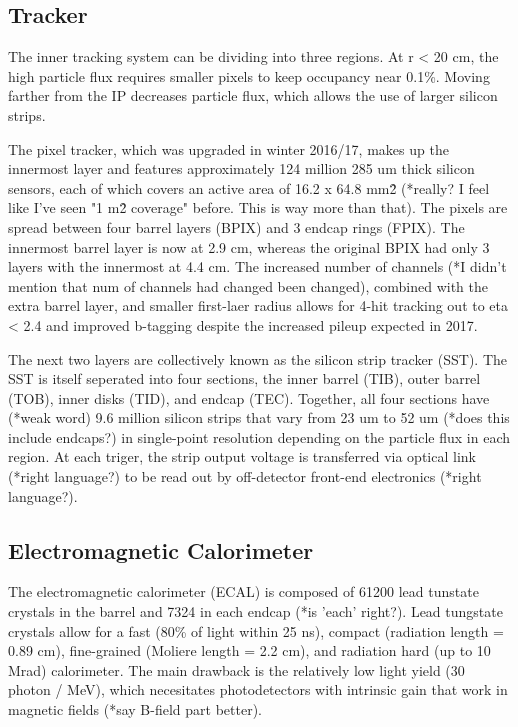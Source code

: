 \documentclass[12pt]{article}
\begin{document}
\subsection{Tracker}
        The inner tracking system can be dividing into three regions. At r < 20 cm, the high particle flux requires smaller pixels to keep occupancy near 0.1\%. Moving farther from the IP decreases particle flux, which allows the use of larger silicon strips.

        The pixel tracker, which was upgraded in winter 2016/17, makes up the innermost layer and features approximately 124 million 285 um thick silicon sensors, each of which covers an active area of 16.2 x 64.8 mm\^2 (*really? I feel like I've seen "1 m\^2 coverage" before. This is way more than that). The pixels are spread between four barrel layers (BPIX) and 3 endcap rings (FPIX). The innermost barrel layer is now at 2.9 cm, whereas the original BPIX had only 3 layers with the innermost at 4.4 cm. The increased number of channels (*I didn't mention that num of channels had changed been changed), combined with the extra barrel layer, and smaller first-laer radius allows for 4-hit tracking out to eta < 2.4 and improved b-tagging despite the increased pileup expected in 2017.

        The next two layers are collectively known as the silicon strip tracker (SST). The SST is itself seperated into four sections, the inner barrel (TIB), outer barrel (TOB), inner disks (TID), and endcap (TEC). Together, all four sections have (*weak word) 9.6 million silicon strips that vary from 23 um to 52 um (*does this include endcaps?) in single-point resolution depending on the particle flux in each region. At each triger, the strip output voltage is transferred via optical link (*right language?) to be read out by off-detector front-end electronics (*right language?).

\subsection{Electromagnetic Calorimeter}
        The electromagnetic calorimeter (ECAL) is composed of 61200 lead tunstate crystals in the barrel and 7324 in each endcap (*is 'each' right?). Lead tungstate crystals allow for a fast (80\% of light within 25 ns), compact (radiation length = 0.89 cm), fine-grained (Moliere length = 2.2 cm), and radiation hard (up to 10 Mrad) calorimeter. The main drawback is the relatively low light yield (30 photon / MeV), which necesitates photodetectors with intrinsic gain that work in magnetic fields (*say B-field part better). 
\end{document}

